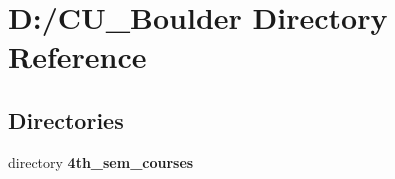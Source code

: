 \section{D\+:/\+C\+U\+\_\+\+Boulder Directory Reference}
\label{dir_e25065e8c8daaa45ea9f8c2e0cb879c0}
\subsection*{Directories}
\begin{DoxyCompactItemize}
\item 
directory \textbf{ 4th\+\_\+sem\+\_\+courses}
\end{DoxyCompactItemize}
